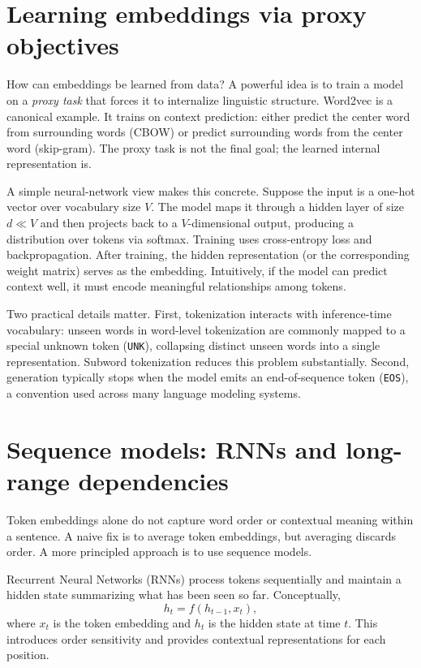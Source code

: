 \section{Learning embeddings via proxy objectives}
How can embeddings be learned from data? A powerful idea is to train a model on a \emph{proxy task} that forces it to internalize linguistic structure. Word2vec is a canonical example. It trains on context prediction: either predict the center word from surrounding words (CBOW) or predict surrounding words from the center word (skip-gram). The proxy task is not the final goal; the learned internal representation is.

A simple neural-network view makes this concrete. Suppose the input is a one-hot vector over vocabulary size $V$. The model maps it through a hidden layer of size $d \ll V$ and then projects back to a $V$-dimensional output, producing a distribution over tokens via softmax. Training uses cross-entropy loss and backpropagation. After training, the hidden representation (or the corresponding weight matrix) serves as the embedding. Intuitively, if the model can predict context well, it must encode meaningful relationships among tokens.

Two practical details matter. First, tokenization interacts with inference-time vocabulary: unseen words in word-level tokenization are commonly mapped to a special unknown token (\texttt{UNK}), collapsing distinct unseen words into a single representation. Subword tokenization reduces this problem substantially. Second, generation typically stops when the model emits an end-of-sequence token (\texttt{EOS}), a convention used across many language modeling systems.

\section{Sequence models: RNNs and long-range dependencies}
Token embeddings alone do not capture word order or contextual meaning within a sentence. A naive fix is to average token embeddings, but averaging discards order. A more principled approach is to use sequence models.

Recurrent Neural Networks (RNNs) process tokens sequentially and maintain a hidden state summarizing what has been seen so far. Conceptually,
\[
h_t = f(h_{t-1}, x_t),
\]
where $x_t$ is the token embedding and $h_t$ is the hidden state at time $t$. This introduces order sensitivity and provides contextual representations for each position.

